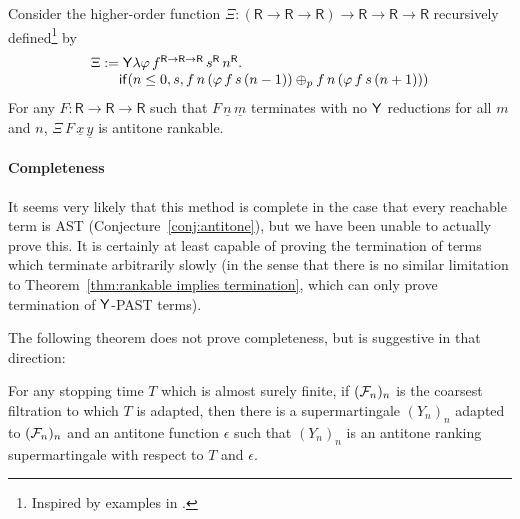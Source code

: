 \begin{example} \label{ex:higher-order recursion}
Consider the higher-order function
$\Xi : (\textsf{R} \to \textsf{R} \to \textsf{R}) \to \textsf{R} \to \textsf{R} \to \textsf{R}$
recursively defined\footnote{Inspired by examples in \cite{DBLP:journals/pacmpl/BurnOR18,DBLP:conf/lics/OngW19}.} by
\[
\begin{array}{l}
\Xi := \mathsf{Y} \lambda \varphi \, f^{\textsf{R} \to \textsf{R} \to \textsf{R}} \, s^\textsf{R} \, n^\textsf{R} . \\
\qquad\mathsf{if}(n \leq 0, s, 
f \, n \, (\varphi \, f \, s \, (n - 1))
\oplus_p
f \, n \, (\varphi \, f \, s \, (n + 1))
)
\end{array}
\]
For any $F : \textsf{R} \to \textsf{R} \to \textsf{R}$ such that $F\, \underline n\, \underline m$ terminates with no $\mathsf{Y}$ reductions for all $m$ and $n$, $\Xi\, F\, \underline x\, \underline y$ is antitone rankable.
\end{example}

\paragraph*{Completeness}
It seems very likely that this method is complete in the case that every reachable term is AST (Conjecture~\ref{conj:antitone}), but we have been unable to actually prove this. It is certainly at least capable of proving the termination of terms which terminate arbitrarily slowly (in the sense that there is no similar limitation to Theorem~\ref{thm:rankable implies termination}, which can only prove termination of $\mathsf{Y}$-PAST terms).

The following theorem does not prove completeness, but is suggestive in that direction:
\begin{therm}
\label{thm:towards completeness}
For any stopping time $T$ which is almost surely finite, if $(\mathcal{F}_n)_n$ is the coarsest filtration to which $T$ is adapted, then there is a supermartingale $(Y_n)_n$ adapted to $(\mathcal{F}_n)_n$ and an antitone function $\epsilon$ such that $(Y_n)_n$ is an antitone ranking supermartingale with respect to $T$ and $\epsilon$.
\end{therm}

